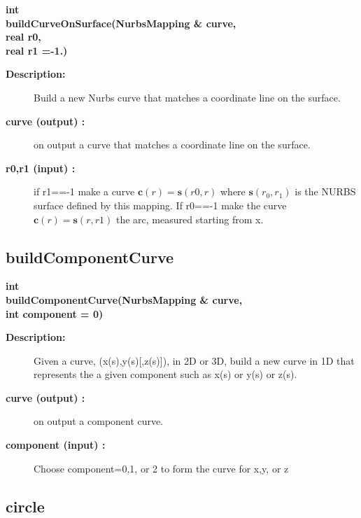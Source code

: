 \begin{flushleft} \textbf{%
int  \\ 
\settowidth{\NurbsMappingIncludeArgIndent}{buildCurveOnSurface(}%
buildCurveOnSurface(NurbsMapping \& curve,\\ 
\hspace{\NurbsMappingIncludeArgIndent}real r0, \\ 
\hspace{\NurbsMappingIncludeArgIndent}real r1  =-1.)
}\end{flushleft}
\begin{description}
\item[{\bf Description:}] 
   Build a new Nurbs curve  that matches a coordinate line on the surface.
\item[{\bf curve (output) :}]  on output a curve that matches a coordinate line on the surface.
\item[{\bf r0,r1 (input) :}]  if r1==-1 make a curve ${\mathbf c}(r) = {\mathbf s}(r0,r)$ where ${\mathbf s}(r_0,r_1)$
   is the NURBS surface defined by this mapping. If r0==-1   
     make the curve ${\mathbf c}(r) = {\mathbf s}(r,r1)$ 
  the arc, measured starting from x.

\end{description}
\subsection{buildComponentCurve}
 
\begin{flushleft} \textbf{%
int  \\ 
\settowidth{\NurbsMappingIncludeArgIndent}{buildComponentCurve(}%
buildComponentCurve(NurbsMapping \& curve,\\ 
\hspace{\NurbsMappingIncludeArgIndent}int component  = 0)
}\end{flushleft}
\begin{description}
\item[{\bf Description:}] 
     Given a curve, (x(s),y(s)[,z(s)]),  in 2D or 3D, build a new curve in 1D that 
  represents the a given component such as x(s) or y(s) or z(s).
\item[{\bf curve (output) :}]  on output a component curve.
\item[{\bf component (input) :}]  Choose component=0,1, or 2 to form the curve for x,y, or z

\end{description}
\subsection{circle}
 
